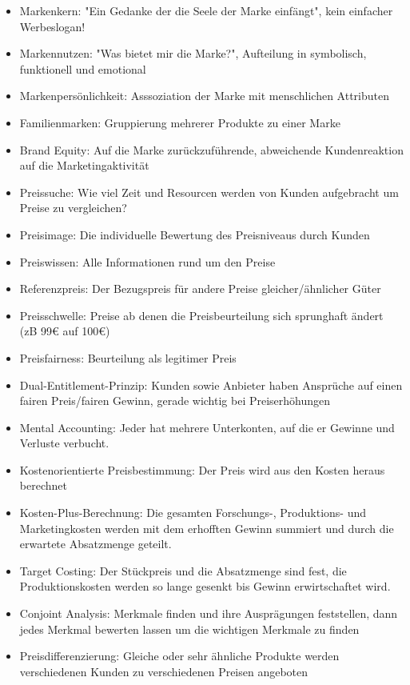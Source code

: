 \documentclass[]{article}
\begin{document}
\begin{itemize}
    \item Markenkern: "Ein Gedanke der die Seele der Marke einfängt", kein einfacher Werbeslogan!
    \item Markennutzen: "Was bietet mir die Marke?", Aufteilung in symbolisch, funktionell und emotional
    \item Markenpersönlichkeit: Asssoziation der Marke mit menschlichen Attributen
    \item Familienmarken: Gruppierung mehrerer Produkte zu einer Marke
    \item Brand Equity: Auf die Marke zurückzuführende, abweichende Kundenreaktion auf die Marketingaktivität
    \item Preissuche: Wie viel Zeit und Resourcen werden von Kunden aufgebracht um Preise zu vergleichen?
    \item Preisimage: Die individuelle Bewertung des Preisniveaus durch Kunden
    \item Preiswissen: Alle Informationen rund um den Preise
    \item Referenzpreis: Der Bezugspreis für andere Preise gleicher/ähnlicher Güter
    \item Preisschwelle: Preise ab denen die Preisbeurteilung sich sprunghaft ändert (zB 99€ auf 100€)
    \item Preisfairness: Beurteilung als legitimer Preis
    \item Dual-Entitlement-Prinzip: Kunden sowie Anbieter haben Ansprüche auf einen fairen Preis/fairen Gewinn, gerade wichtig bei Preiserhöhungen
    \item Mental Accounting: Jeder hat mehrere Unterkonten, auf die er Gewinne und Verluste verbucht.
    \item Kostenorientierte Preisbestimmung: Der Preis wird aus den Kosten heraus berechnet
    \item Kosten-Plus-Berechnung: Die gesamten Forschungs-, Produktions- und Marketingkosten werden mit dem erhofften Gewinn summiert und durch die erwartete Absatzmenge geteilt.
    \item Target Costing: Der Stückpreis und die Absatzmenge sind fest, die Produktionskosten werden so lange gesenkt bis Gewinn erwirtschaftet wird.
    \item Conjoint Analysis: Merkmale finden und ihre Ausprägungen feststellen, dann jedes Merkmal bewerten lassen um die wichtigen Merkmale zu finden
    \item Preisdifferenzierung: Gleiche oder sehr ähnliche Produkte werden verschiedenen Kunden zu verschiedenen Preisen angeboten

\end{itemize}
\end{document}
